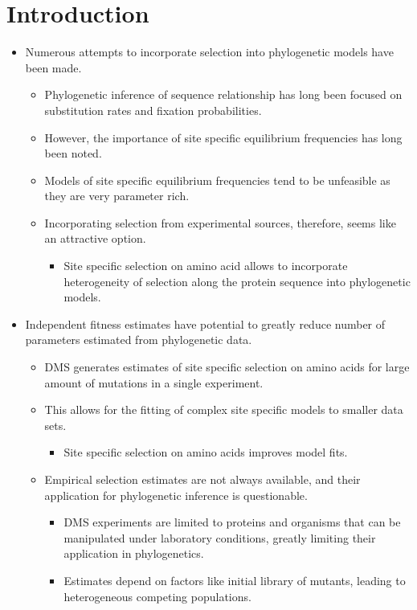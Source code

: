 \documentclass[12pt]{article}
\begin{document}
\section*{Introduction}
\begin{itemize}
	\item Numerous attempts to incorporate selection into phylogenetic models have been made.
	\begin{itemize}
		\item Phylogenetic inference of sequence relationship has long been focused on substitution rates and fixation probabilities.
		\item However, the importance of site specific equilibrium frequencies has long been noted.
		\item Models of site specific equilibrium frequencies tend to be unfeasible as they are very parameter rich.
		\item Incorporating selection from experimental sources, therefore, seems like an attractive option.
		\begin{itemize}
			\item Site specific selection on amino acid allows to incorporate heterogeneity of selection along the protein sequence into phylogenetic models.
		\end{itemize}
	\end{itemize}
	\item Independent fitness estimates have potential to greatly reduce number of parameters estimated from phylogenetic data.
	\begin{itemize}
		\item DMS generates estimates of site specific selection on amino acids for large amount of mutations in a single experiment.
		\item This allows for the fitting of complex site specific models to smaller data sets.
		\begin{itemize}
			\item Site specific selection on amino acids improves model fits.
		\end{itemize}
		\item Empirical selection estimates are not always available, and their application for phylogenetic inference is questionable.
		\begin{itemize}
			\item DMS experiments are limited to proteins and organisms that can be manipulated under laboratory conditions, greatly limiting their application in phylogenetics.
			\item Estimates depend on factors like initial library of mutants, leading to heterogeneous competing populations.

\end{itemize}
\end{itemize}
\end{itemize}
\end{document}
